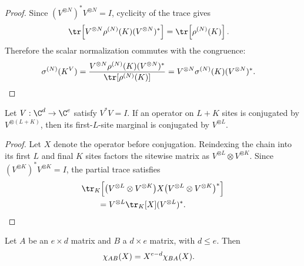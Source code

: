 \begin{proof}\leanok
    Since $(V^{\otimes N})^*V^{\otimes N}=I$, cyclicity of the trace gives
    \begin{align}
        \tr\!\left[
            V^{\otimes N}\rho^{(N)}(K)(V^{\otimes N})^*\right]
         & =\tr\!\left[\rho^{(N)}(K)\right].
        \notag
    \end{align}
    Therefore the scalar normalization commutes with the congruence:
    \begin{align}
        \sigma^{(N)}(K^V)
         & =\frac{V^{\otimes N}\rho^{(N)}(K)(V^{\otimes N})^*}
        {\tr[\rho^{(N)}(K)]}
        =V^{\otimes N}\sigma^{(N)}(K)(V^{\otimes N})^*.
        \notag
    \end{align}
\end{proof}

\begin{lemma}
    \label{thm:mpdo_block_reduced_state_single_kraus_sitewise}
    \leanok
    Let $V:\C^d\to\C^e$ satisfy $V^*V=I$.  If an operator on $L+K$ sites is
    conjugated by $V^{\otimes(L+K)}$, then its first-$L$-site marginal is
    conjugated by $V^{\otimes L}$.
\end{lemma}

\begin{proof}\leanok
    Let $X$ denote the operator before conjugation. Reindexing the chain into
    its first $L$ and final $K$ sites factors the sitewise matrix as
    $V^{\otimes L}\otimes V^{\otimes K}$. Since
    $(V^{\otimes K})^*V^{\otimes K}=I$, the partial trace satisfies
    \begin{align}
         & \tr_K\!\left[
            \bigl(V^{\otimes L}\otimes V^{\otimes K}\bigr)X
            \bigl(V^{\otimes L}\otimes V^{\otimes K}\bigr)^*\right]
        \notag                                            \\
         & \qquad=V^{\otimes L}\tr_K[X](V^{\otimes L})^*.
        \notag
    \end{align}
\end{proof}

\begin{lemma}
    \label{lem:matrix_rectangular_charpoly_cyclicity}
    \mathlibok %
    Let $A$ be an $e\times d$ matrix and $B$ a $d\times e$ matrix, with
    $d\leq e$. Then
    \begin{align}
        \chi_{AB}(X) & =X^{e-d}\chi_{BA}(X).
        \notag
    \end{align}
\end{lemma}

